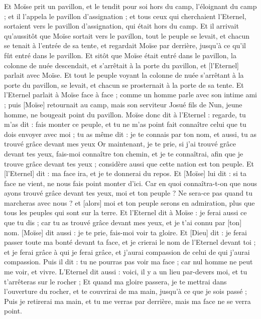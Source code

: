 \begin{multicols}{2}
Et Moïse prit un pavillon, et le tendit pour soi hors du camp, l'éloignant du camp ; et il l'appela le pavillon d'assignation ; et tous ceux qui cherchaient l'Eternel, sortaient vers le pavillon d'assignation, qui était hors du camp.
Et il arrivait qu'aussitôt que Moïse sortait vers le pavillon, tout le peuple se levait, et chacun se tenait à l'entrée de sa tente, et regardait Moïse par derrière, jusqu’à ce qu'il fût entré dans le pavillon.
Et sitôt que Moïse était entré dans le pavillon, la colonne de nuée descendait, et s'arrêtait à la porte du pavillon, et [l'Eternel] parlait avec Moïse.
Et tout le peuple voyant la colonne de nuée s'arrêtant à la porte du pavillon, se levait, et chacun se prosternait à la porte de sa tente.
Et l'Eternel parlait à Moïse face à face ; comme un homme parle avec son intime ami ; puis [Moïse] retournait au camp, mais son serviteur Josué fils de Nun, jeune homme, ne bougeait point du pavillon.
Moïse donc dit à l'Eternel : regarde, tu m'as dit : fais monter ce peuple, et tu ne m'as point fait connaître celui que tu dois envoyer avec moi ; tu as même dit : je te connais par ton nom, et aussi, tu as trouvé grâce devant mes yeux
Or maintenant, je te prie, si j'ai trouvé grâce devant tes yeux, fais-moi connaître ton chemin, et je te connaîtrai, afin que je trouve grâce devant tes yeux ; considère aussi que cette nation est ton peuple.
Et [l'Eternel] dit : ma face ira, et je te donnerai du repos.
Et [Moïse] lui dit : si ta face ne vient, ne nous fais point monter d'ici.
Car en quoi connaîtra-t-on que nous ayons trouvé grâce devant tes yeux, moi et ton peuple ? Ne sera-ce pas quand tu marcheras avec nous ? et [alors] moi et ton peuple serons en admiration, plus que tous les peuples qui sont sur la terre.
Et l'Eternel dit à Moïse : je ferai aussi ce que tu dis ; car tu as trouvé grâce devant mes yeux, et je t'ai connu par [ton] nom.
[Moïse] dit aussi : je te prie, fais-moi voir ta gloire.
Et [Dieu] dit : je ferai passer toute ma bonté devant ta face, et je crierai le nom de l'Eternel devant toi ; et je ferai grâce à qui je ferai grâce, et j'aurai compassion de celui de qui j'aurai compassion.
Puis il dit : tu ne pourras pas voir ma face ; car nul homme ne peut me voir, et vivre.
L'Eternel dit aussi : voici, il y a un lieu par-devers moi, et tu t'arrêteras sur le rocher ;
Et quand ma gloire passera, je te mettrai dans l'ouverture du rocher, et te couvrirai de ma main, jusqu’à ce que je sois passé ;
Puis je retirerai ma main, et tu me verras par derrière, mais ma face ne se verra point.

\end{multicols}
